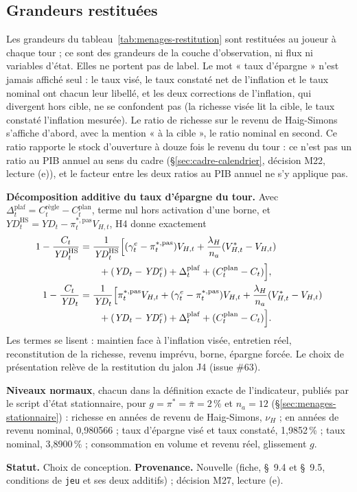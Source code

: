 \documentclass[11pt,a4paper]{article}
\begin{document}
\subsection{Grandeurs restituées}
\label{sec:menages-restitution}
\begin{proposee}
Les grandeurs du tableau~\ref{tab:menages-restitution} sont restituées au joueur à chaque tour ; ce sont des grandeurs de la couche d'observation, ni flux ni variables d'état. Elles ne portent pas de label. Le mot « taux d'épargne » n'est jamais affiché seul : le taux visé, le taux constaté net de l'inflation et le taux nominal ont chacun leur libellé, et les deux corrections de l'inflation, qui divergent hors cible, ne se confondent pas (la richesse visée lit la cible, le taux constaté l'inflation mesurée). Le ratio de richesse sur le revenu de Haig-Simons s'affiche d'abord, avec la mention « à la cible », le ratio nominal en second. Ce ratio rapporte le stock d'ouverture à douze fois le revenu du tour : ce n'est pas un ratio au PIB annuel au sens du cadre (\S\ref{sec:cadre-calendrier}, décision M22, lecture (e)), et le facteur entre les deux ratios au PIB annuel ne s'y applique pas.

\textbf{Décomposition additive du taux d'épargne du tour.} Avec $\Delta^{\mathrm{plaf}}_t = C^{\text{règle}}_t - C^{\mathrm{plan}}_t$, terme nul hors activation d'une borne, et $\mathit{YD}^{\mathrm{HS}}_t = \mathit{YD}_t - \pi^{\ast,\mathrm{pas}}_t V_{H,t}$, H4 donne exactement
\begin{align*}
1 - \frac{C_t}{\mathit{YD}^{\mathrm{HS}}_t} &= \frac{1}{\mathit{YD}^{\mathrm{HS}}_t}\Bigl[(\gamma^e_t - \pi^{\ast,\mathrm{pas}}_t) V_{H,t} + \frac{\lambda_H}{n_a}(V^\ast_{H,t} - V_{H,t}) \\
&\qquad + (\mathit{YD}_t - \mathit{YD}^e_t) + \Delta^{\mathrm{plaf}}_t + (C^{\mathrm{plan}}_t - C_t)\Bigr], \\
1 - \frac{C_t}{\mathit{YD}_t} &= \frac{1}{\mathit{YD}_t}\Bigl[\pi^{\ast,\mathrm{pas}}_t V_{H,t} + (\gamma^e_t - \pi^{\ast,\mathrm{pas}}_t) V_{H,t} + \frac{\lambda_H}{n_a}(V^\ast_{H,t} - V_{H,t}) \\
&\qquad + (\mathit{YD}_t - \mathit{YD}^e_t) + \Delta^{\mathrm{plaf}}_t + (C^{\mathrm{plan}}_t - C_t)\Bigr] .
\end{align*}
Les termes se lisent : maintien face à l'inflation visée, entretien réel, reconstitution de la richesse, revenu imprévu, borne, épargne forcée. Le choix de présentation relève de la restitution du jalon J4 (issue \#63).

\textbf{Niveaux normaux}, chacun dans la définition exacte de l'indicateur, publiés par le script d'état stationnaire, pour $g = \pi^\ast = \bar\pi = 2\,\%$ et $n_a = 12$ (\S\ref{sec:menages-stationnaire}) : richesse en années de revenu de Haig-Simons, $\nu_H$ ; en années de revenu nominal, 0,980566 ; taux d'épargne visé et taux constaté, 1,9852\,\% ; taux nominal, 3,8900\,\% ; consommation en volume et revenu réel, glissement $g$.

\textbf{Statut.} Choix de conception. \textbf{Provenance.} Nouvelle (fiche, \S~9.4 et \S~9.5, conditions de \texttt{jeu} et ses deux additifs) ; décision M27, lecture (e).
\end{proposee}
\end{document}
